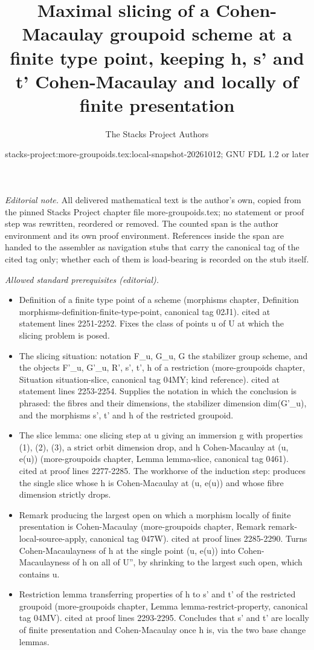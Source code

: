 \documentclass{stacks-project}
\title{Maximal slicing of a Cohen-Macaulay groupoid scheme at a finite type point, keeping h, s' and t' Cohen-Macaulay and locally of finite presentation}
\author{The Stacks Project Authors}
\date{stacks-project:more-groupoids.tex:local-snapshot-20261012; GNU FDL 1.2 or later}
\theoremstyle{plain}
\theoremstyle{definition}
\theoremstyle{remark}
\numberwithin{equation}{subsection}
\begin{document}
\maketitle
\setcounter{subsection}{1}
\noindent\textit{Editorial note.} All delivered mathematical text is the author's own, copied from the pinned Stacks Project chapter file more-groupoids.tex; no statement or proof step was rewritten, reordered or removed. The counted span is the author environment and its own proof environment. References inside the span are handed to the assembler as navigation stubs that carry the canonical tag of the cited tag only; whether each of them is load-bearing is recorded on the stub itself.\par\medskip
\noindent\textit{Allowed standard prerequisites (editorial).}\begin{itemize}
\item Definition of a finite type point of a scheme (morphisms chapter, Definition morphisms-definition-finite-type-point, canonical tag 02J1). cited at statement lines 2251-2252. Fixes the class of points u of U at which the slicing problem is posed.
\item The slicing situation: notation F\_u, G\_u, G the stabilizer group scheme, and the objects F'\_u, G'\_u, R', s', t', h of a restriction (more-groupoids chapter, Situation situation-slice, canonical tag 04MY; kind reference). cited at statement lines 2253-2254. Supplies the notation in which the conclusion is phrased: the fibres and their dimensions, the stabilizer dimension dim(G'\_u), and the morphisms s', t' and h of the restricted groupoid.
\item The slice lemma: one slicing step at u giving an immersion g with properties (1), (2), (3), a strict orbit dimension drop, and h Cohen-Macaulay at (u, e(u)) (more-groupoids chapter, Lemma lemma-slice, canonical tag 0461). cited at proof lines 2277-2285. The workhorse of the induction step: produces the single slice whose h is Cohen-Macaulay at (u, e(u)) and whose fibre dimension strictly drops.
\item Remark producing the largest open on which a morphism locally of finite presentation is Cohen-Macaulay (more-groupoids chapter, Remark remark-local-source-apply, canonical tag 047W). cited at proof lines 2285-2290. Turns Cohen-Macaulayness of h at the single point (u, e(u)) into Cohen-Macaulayness of h on all of U'', by shrinking to the largest such open, which contains u.
\item Restriction lemma transferring properties of h to s' and t' of the restricted groupoid (more-groupoids chapter, Lemma lemma-restrict-property, canonical tag 04MV). cited at proof lines 2293-2295. Concludes that s' and t' are locally of finite presentation and Cohen-Macaulay once h is, via the two base change lemmas.

\end{itemize}
\end{document}
